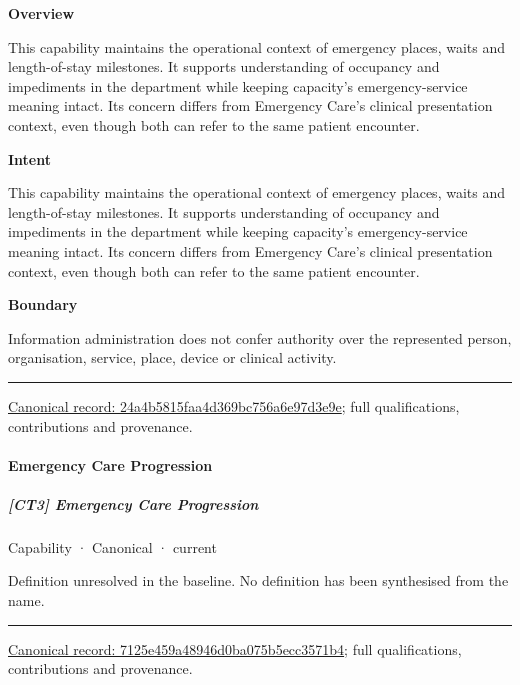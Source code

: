 \textbf{Overview}



This capability maintains the operational context of emergency places, waits and length-of-stay milestones. It supports understanding of occupancy and impediments in the department while keeping capacity's emergency-service meaning intact. Its concern differs from Emergency Care's clinical presentation context, even though both can refer to the same patient encounter.



\textbf{Intent}



This capability maintains the operational context of emergency places, waits and length-of-stay milestones. It supports understanding of occupancy and impediments in the department while keeping capacity's emergency-service meaning intact. Its concern differs from Emergency Care's clinical presentation context, even though both can refer to the same patient encounter.



\textbf{Boundary}



Information administration does not confer authority over the represented person, organisation, service, place, device or clinical activity.



\medskip\hrule\medskip

{\footnotesize \href{../../../../continuum/strategy/capability/24a4b5815faa4d369bc756a6e97d3e9e.md}{Canonical record: 24a4b5815faa4d369bc756a6e97d3e9e}; full qualifications, contributions and provenance.}\par
\paragraph{Emergency Care Progression}

\subparagraph{[CT3] Emergency Care Progression}

\label{element:7125e459a48946d0ba075b5ecc3571b4}
{\small Capability · Canonical · current}\par

Definition unresolved in the baseline. No definition has been synthesised from the name.



\medskip\hrule\medskip

{\footnotesize \href{../../../../continuum/strategy/capability/7125e459a48946d0ba075b5ecc3571b4.md}{Canonical record: 7125e459a48946d0ba075b5ecc3571b4}; full qualifications, contributions and provenance.}\par
